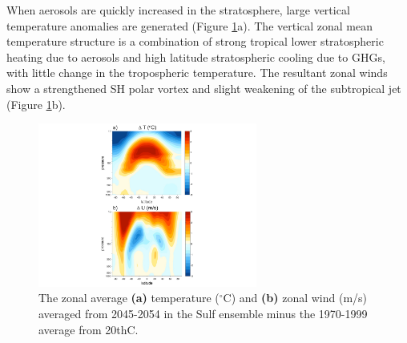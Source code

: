 \documentclass[draft,grl]{AGUTeX}  %
\begin{document}
\begin{article}
When aerosols are quickly increased in the stratosphere, large vertical temperature anomalies are generated (Figure \ref{fig:vert}a). The vertical zonal mean temperature structure is a combination of strong tropical lower stratospheric heating due to aerosols \citep{ferraro11} and high latitude stratospheric cooling due to GHGs, with little change in the tropospheric temperature. The resultant zonal winds show a strengthened SH polar vortex and slight weakening of the subtropical jet (Figure \ref{fig:vert}b). %

\begin{figure}[htbp] %
\centering
 \noindent\includegraphics[width=17pc]{figures/verticalU_T_v20thC2.pdf}  %
\caption{The zonal average \textbf{(a)} temperature ($^\circ$C) and \textbf{(b)} zonal wind (m/s) averaged from 2045-2054 in the Sulf ensemble minus the 1970-1999 average from 20thC.}
\label{fig:vert}
\end{figure}


\end{article}
\end{document}
